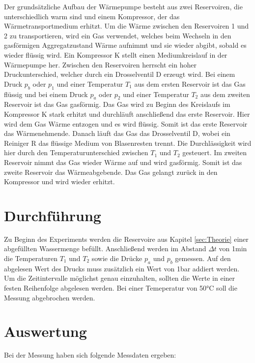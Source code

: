     Der grundsätzliche Aufbau der Wärmepumpe besteht aus zwei Reservoiren, die unterschiedlich warm sind und einem Kompressor, 
    der das Wärmetransportmedium erhitzt.
    Um die Wärme zwischen den Reservoiren 1 und 2 zu transportieren, wird ein Gas verwendet, welches beim Wechseln in den gasförmigen
    Aggregatzustand Wärme aufnimmt und sie wieder abgibt, sobald es wieder flüssig wird.
    Ein Kompressor K stellt einen Mediumkreislauf in der Wärmepumpe her.
    Zwischen den Reservoiren herrscht ein hoher Druckunterschied, welcher durch ein Drosselventil D erzeugt wird. 
    Bei einem Druck $p_b$ oder $p_1$ und einer Temperatur $T_1$ aus dem ersten Reservoir ist das Gas flüssig und bei einem Druck $p_a$ oder $p_2$ 
    und einer Temperatur $T_2$ aus dem zweiten Reservoir ist das Gas gasförmig. 
    Das Gas wird zu Beginn des Kreislaufs im Kompressor K stark erhitzt und durchläuft anschließend das erste Reservoir. 
    Hier wird dem Gas Wärme entzogen und es wird flüssig. Somit ist das erste Reservoir das Wärmenehmende.
    Danach läuft das Gas das Drosselventil D, wobei ein Reiniger R das flüssige Medium von Blasenresten trennt. 
    Die Durchlässigkeit wird hier durch den Temperaturunterschied zwischen $T_1$ und $T_2$ gesteuert.
    Im zweiten Reservoir nimmt das Gas wieder Wärme auf und wird gasförmig. Somit ist das zweite Reservoir das Wärmeabgebende.
    Das Gas gelangt zurück in den Kompressor und wird wieder erhitzt.
            

\section{Durchführung} \label{sec:Durchführung}
    Zu Beginn des Experiments werden die Reservoire aus Kapitel \ref{sec:Theorie} einer abgefüllten Wassermenge befüllt.
    Anschließend werden im Abstand $\Delta t$ von 1min die Temperaturen $T_1$ und $T_2$ sowie die Drücke $p_a$ und $p_b$ gemessen.
    Auf den abgelesen Wert des Drucks muss zusätzlich ein Wert von 1bar addiert werden.
    Um die Zeitintervalle möglichst genau einzuhalten, sollten die Werte in einer festen Reihenfolge abgelesen werden.
    Bei einer Temeperatur von 50°C soll die Messung abgebrochen werden.

\section{Auswertung} \label{sec:Auswertung}
    Bei der Messung haben sich folgende Messdaten ergeben:

